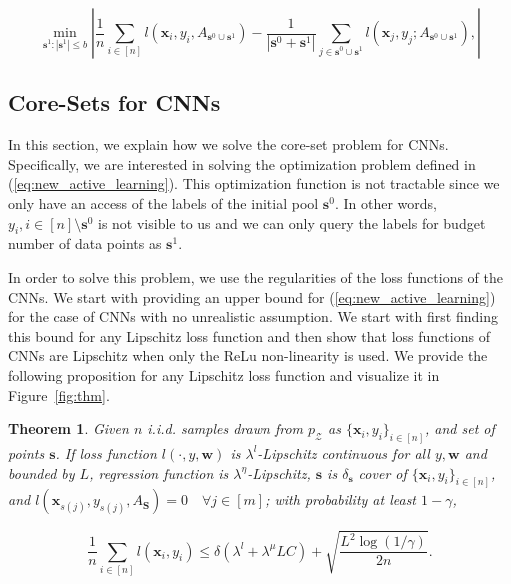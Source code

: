 \documentclass{article} %
\newtheorem{theorem}{Theorem}
\begin{document}
\begin{equation} \min_{\mathbf{s}^1 : |\mathbf{s}^1| \leq b} 
\left| \frac{1}{n}\sum_{i \in [n]} l(\mathbf{x}_i,y_i,A_{\mathbf{s}^0 \cup \mathbf{s}^1}) -
    \frac{1}{|\mathbf{s}^0+\mathbf{s}^1|}\sum_{j \in \mathbf{s}^0 \cup \mathbf{s}^1} l(\mathbf{x}_j,y_j;A_{\mathbf{s}^0 \cup \mathbf{s}^1}),
    \right|
    \label{eq:new_active_learning}
\end{equation} 

\subsection{Core-Sets for CNNs}
In this section, we explain how we solve the core-set problem for CNNs. Specifically, we are interested in solving the
optimization problem defined in (\ref{eq:new_active_learning}). This optimization function is not tractable since we
only have an access of the labels of the initial pool $\mathbf{s}^0$. In other words, $y_i, i \in [n] \setminus
\mathbf{s}^0$ is not visible to us and we can only query the labels for budget number of data points as $\mathbf{s}^1$.

In order to solve this problem, we use the regularities of the loss functions of the CNNs. We start with providing an
upper bound for (\ref{eq:new_active_learning}) for the case of CNNs with no unrealistic assumption. We start with
first finding this bound for any Lipschitz loss function and then show that loss functions of CNNs are Lipschitz when
only the ReLu non-linearity is used. We provide the following proposition for any Lipschitz loss function and visualize
it in Figure~\ref{fig:thm}.

\begin{theorem} Given $n$ i.i.d. samples drawn from $p_\mathcal{Z}$ as $\{\mathbf{x}_i,y_i\}_{i\in[n]}$, and set of
    points $\mathbf{s}$. If loss function $l(\cdot,y,\mathbf{w})$ is $\lambda^l$-Lipschitz continuous
    for all $y, \mathbf{w}$ and bounded by $L$, regression function is $\lambda^\eta$-Lipschitz, $\mathbf{s}$
    is $\delta_\mathbf{s}$ cover of $\{\mathbf{x}_i,y_i\}_{i\in[n]}$, and
    $l(\mathbf{x}_{s(j)},y_{s(j)},A_\mathbf{S})=0\quad \forall j \in [m]$; with probability at least $1-\gamma$,
    \begin{small} \[
\frac{1}{n}\sum_{i \in [n]} l(\mathbf{x}_i,y_i) \leq \delta (\lambda^l + \lambda^\mu LC)+ \sqrt{\frac{L^2
    \log(1/\gamma)}{2n}}. \] \end{small}
\label{mainthm2} \end{theorem}
\end{document}
